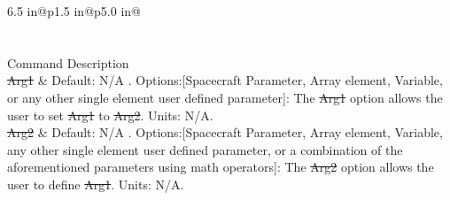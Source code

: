 \noindent
{}
\tablefirsthead{\hline\hline}\label{Table:AssignmentCommand}
\tabletail{\hline\hline}
\tablelasttail{\hline\hline}
\begin{supertabular*}{6.5 in}{@{}p{1.5 in}@{\extracolsep{\fill}}p{5.0 in}@{}}
    \\
    \\\\
    \hline\hline
    Command Description\\
    \hline
    \st{Arg1} & Default: N/A . Options:[Spacecraft Parameter, Array element, Variable,
    or any other single element user defined parameter]:
    The \st{Arg1} option allows the user to set \st{Arg1} to \st{Arg2}. Units: N/A.\\
    \st{Arg2} & Default: N/A . Options:[Spacecraft Parameter, Array element, Variable,
    any other single element user defined parameter, or a combination of the aforementioned
    parameters using math operators]:
    The \st{Arg2} option allows the user to define \st{Arg1}. Units: N/A.\\\\

    \hline\hline
    \\
    \hline
    \\
    \\
    \\
    \\\\

\end{supertabular*}\\
